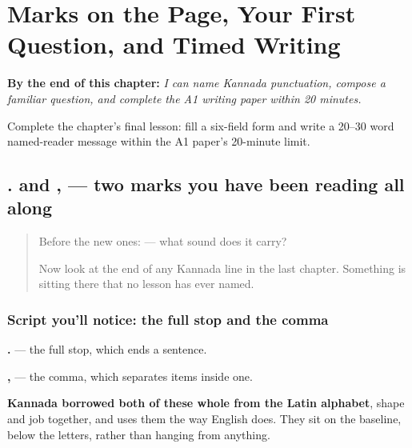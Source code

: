 
\chapter{Marks on the Page, Your First Question, and Timed Writing}
\label{ch:ka-viraama-chihne}

\begin{chapteropening}
\textbf{By the end of this chapter:} \emph{I can name Kannada punctuation, compose a familiar question, and complete the A1 writing paper within 20 minutes.}

Complete the chapter's final lesson: fill a six-field form and write a 20–30 word named-reader message within the A1 paper's 20-minute limit.
\end{chapteropening}

\section[. , (full stop, comma)]{. and , — two marks you have been reading all along}

\label{lesson:KA-S152-full-stop-and-comma}



\begin{quote}
Before the new ones:  — what sound does it carry?

Now look at the end of any Kannada line in the last chapter. Something is sitting there that no lesson has ever named.
\end{quote}

\subsection*{Script you'll notice: the full stop and the comma}
\textbf{.} — the full stop, which ends a sentence.

\textbf{,} — the comma, which separates items inside one.

\textbf{Kannada borrowed both of these whole from the Latin alphabet}, shape and job together, and uses them the way English does. They sit on the baseline, below the letters, rather than hanging from anything.

